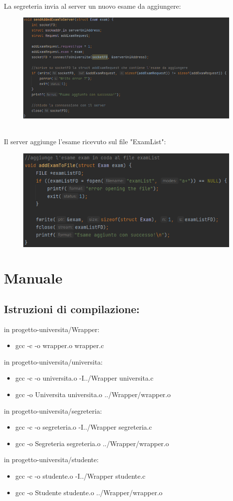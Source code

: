 \documentclass{article}
\begin{document}
\\La segreteria invia al server un nuovo esame da aggiungere:
\begin{figure}[htp]
    \centering
    \includegraphics[width=1\linewidth]{addExamSeg.png}
\end{figure}
\\Il server aggiunge l'esame ricevuto sul file "ExamList":
\begin{figure}[htp]
    \centering
    \includegraphics[width=0.8\linewidth]{addExamUni.png}
\end{figure}
\newpage
\section{Manuale}
\subsection{Istruzioni di compilazione:}
in progetto-universita/Wrapper:
\begin{itemize}
    \item gcc -c -o wrapper.o wrapper.c
\end{itemize}
in progetto-universita/universita:
\begin{itemize}
    \item gcc -c -o universita.o -I../Wrapper universita.c
    \item gcc -o Universita universita.o ../Wrapper/wrapper.o
\end{itemize}
in progetto-universita/segreteria:
\begin{itemize}
    \item gcc -c -o segreteria.o -I../Wrapper segreteria.c
    \item gcc -o Segreteria segreteria.o ../Wrapper/wrapper.o
\end{itemize}
in progetto-universita/studente:
\begin{itemize}
    \item gcc -c -o studente.o -I../Wrapper studente.c
    \item gcc -o Studente studente.o ../Wrapper/wrapper.o
\end{itemize}
\end{document}
